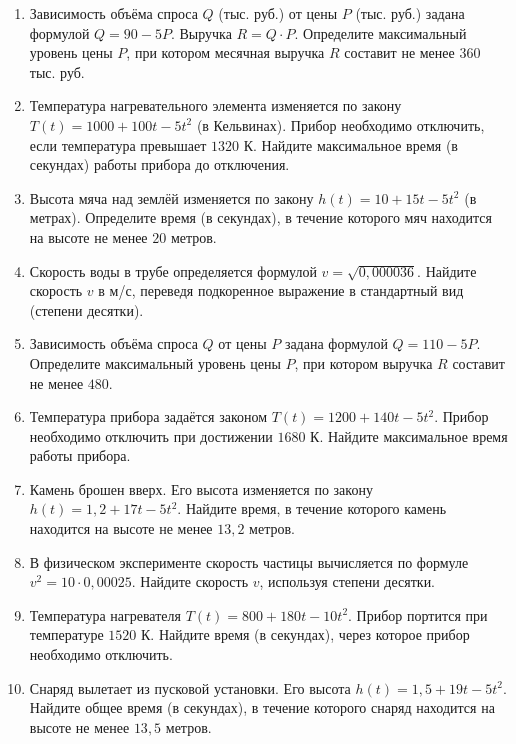 \documentclass[a4paper,12pt]{article}
\begin{document}
\begin{enumerate}[label=\textbf{\arabic*.}]
\item 
Зависимость объёма спроса $Q$ (тыс. руб.) от цены $P$ (тыс. руб.) задана формулой $Q = 90 - 5P$. Выручка $R = Q \cdot P$. Определите максимальный уровень цены $P$, при котором месячная выручка $R$ составит не менее $360$ тыс. руб.

\item 
Температура нагревательного элемента изменяется по закону $T(t) = 1000 + 100t - 5t^2$ (в Кельвинах). Прибор необходимо отключить, если температура превышает $1320$ К. Найдите максимальное время (в секундах) работы прибора до отключения.

\item 
Высота мяча над землёй изменяется по закону $h(t) = 10 + 15t - 5t^2$ (в метрах). Определите время (в секундах), в течение которого мяч находится на высоте не менее $20$ метров.

\item 
Скорость воды в трубе определяется формулой $v = \sqrt{0{,}000036}$. Найдите скорость $v$ в м/с, переведя подкоренное выражение в стандартный вид (степени десятки).

\item 
Зависимость объёма спроса $Q$ от цены $P$ задана формулой $Q = 110 - 5P$. Определите максимальный уровень цены $P$, при котором выручка $R$ составит не менее $480$.

\item 
Температура прибора задаётся законом $T(t) = 1200 + 140t - 5t^2$. Прибор необходимо отключить при достижении $1680$ К. Найдите максимальное время работы прибора.

\item 
Камень брошен вверх. Его высота изменяется по закону $h(t) = 1{,}2 + 17t - 5t^2$. Найдите время, в течение которого камень находится на высоте не менее $13{,}2$ метров.

\item 
В физическом эксперименте скорость частицы вычисляется по формуле $v^2 = 10 \cdot 0{,}00025$. Найдите скорость $v$, используя степени десятки.

\item 
Температура нагревателя $T(t) = 800 + 180t - 10t^2$. Прибор портится при температуре $1520$ К. Найдите время (в секундах), через которое прибор необходимо отключить.

\item 
Снаряд вылетает из пусковой установки. Его высота $h(t) = 1{,}5 + 19t - 5t^2$. Найдите общее время (в секундах), в течение которого снаряд находится на высоте не менее $13{,}5$ метров.
\end{enumerate}
\end{document}
